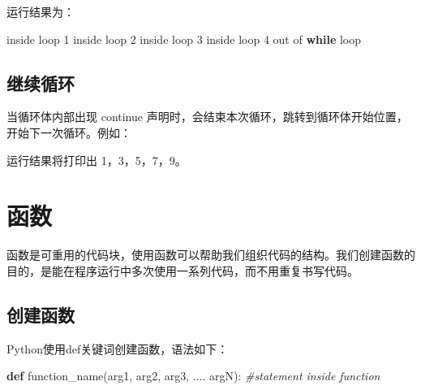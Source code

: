 \documentclass[]{ctexbook}
\newenvironment{Shaded}{\begin{snugshade}}{\end{snugshade}}
\newcommand{\BuiltInTok}[1]{#1}
\newcommand{\CommentTok}[1]{\textcolor[rgb]{0.56,0.35,0.01}{\textit{#1}}}
\newcommand{\ControlFlowTok}[1]{\textcolor[rgb]{0.13,0.29,0.53}{\textbf{#1}}}
\newcommand{\DecValTok}[1]{\textcolor[rgb]{0.00,0.00,0.81}{#1}}
\newcommand{\KeywordTok}[1]{\textcolor[rgb]{0.13,0.29,0.53}{\textbf{#1}}}
\newcommand{\NormalTok}[1]{#1}
\newcommand{\OperatorTok}[1]{\textcolor[rgb]{0.81,0.36,0.00}{\textbf{#1}}}
\begin{document}
运行结果为：

\begin{Shaded}
\begin{Highlighting}[]
\NormalTok{inside loop }\DecValTok{1}
\NormalTok{inside loop }\DecValTok{2}
\NormalTok{inside loop }\DecValTok{3}
\NormalTok{inside loop }\DecValTok{4}
\NormalTok{out of }\ControlFlowTok{while}\NormalTok{ loop}
\end{Highlighting}
\end{Shaded}

\hypertarget{ux7ee7ux7eedux5faaux73af}{%
\subsection{继续循环}\label{ux7ee7ux7eedux5faaux73af}}

当循环体内部出现 continue 声明时，会结束本次循环，跳转到循环体开始位置，开始下一次循环。例如：

\begin{Shaded}
\end{Shaded}

运行结果将打印出 1，3，5，7，9。

\hypertarget{ux51fdux6570}{%
\section{函数}\label{ux51fdux6570}}

函数是可重用的代码块，使用函数可以帮助我们组织代码的结构。我们创建函数的目的，是能在程序运行中多次使用一系列代码，而不用重复书写代码。

\hypertarget{ux521bux5efaux51fdux6570}{%
\subsection{创建函数}\label{ux521bux5efaux51fdux6570}}

Python使用def关键词创建函数，语法如下：

\begin{Shaded}
\begin{Highlighting}[]
\KeywordTok{def}\NormalTok{ function_name(arg1, arg2, arg3, .... argN):}
     \CommentTok{#statement inside function}
\end{Highlighting}
\end{Shaded}
\end{document}
